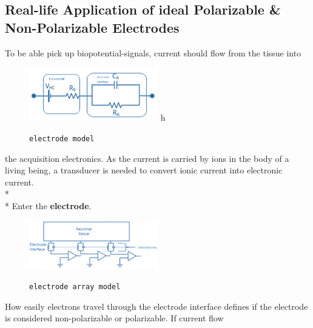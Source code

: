     \subsection{Real-life Application of ideal Polarizable \& Non-Polarizable Electrodes} %
    \label{subsec:electrodes}
    To be able pick up biopotential-signals, current should flow from the tissue into
        \begin{figure}
      \centering
      \vspace{-20pt}
      \caption{\texttt{\footnotesize{electrode model}}}
      \includegraphics[width=0.5\textwidth]{images/electrical-probe-model1.png}
      \vspace{-35pt}
      \label{fig:probe-model}h
    \end{figure}
    the acquisition electronics. As the current is carried by ions in the body of a 
    living being, a transducer is needed to convert ionic current into electronic
    current.\\*\\*
    Enter the \textbf{electrode}.\\ %
    \begin{figure}
      \centering
      \vspace{-20pt}
      \caption{\texttt{\footnotesize{electrode array model}}}
      \includegraphics[width=0.5\textwidth]{images/electrical-probe-model-arrays.png}
      \vspace{-20pt}
      \label{fig:probe-model-array}
    \end{figure}
    How easily electrons travel through the electrode interface defines if the electrode is considered non-polarizable or polarizable. If current flow 
